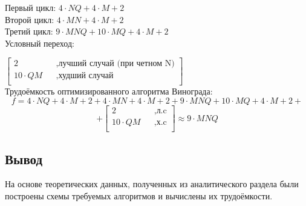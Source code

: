 \begin{enumerate}
        Первый цикл: $4 \cdot N  Q + 4 \cdot M + 2$ \\
        Второй цикл: $4 \cdot M  N + 4 \cdot M + 2$\\
        Третий цикл: $9 \cdot M  N Q + 10 \cdot M Q + 4 \cdot M + 2$\\
        Условный переход:

        $\begin{bmatrix}
            2   &&, \text{лучший случай (при четном N)}\\
            10 \cdot QM &&, \text{худший случай}\\
        \end{bmatrix} $ \\

        Трудоёмкость оптимизированного алгоритма Винограда:
        \\$$f = 4 \cdot N  Q + 4 \cdot M + 2 + 4 \cdot M  N + 4 \cdot M + 2 + 9 \cdot M  N Q + 10 \cdot M Q + 4 \cdot M + 2 + $$
        $$ + \begin{bmatrix}
                    2   &&, \text{л.c}\\
                    10 \cdot QM &&, \text{х.c}\\
            \end{bmatrix} \approx 9 \cdot MNQ$$
	\end{enumerate}

\subsection{Вывод}
На основе теоретических данных, полученных из аналитического раздела были построены схемы требуемых алгоритмов и вычислены их трудоёмкости.